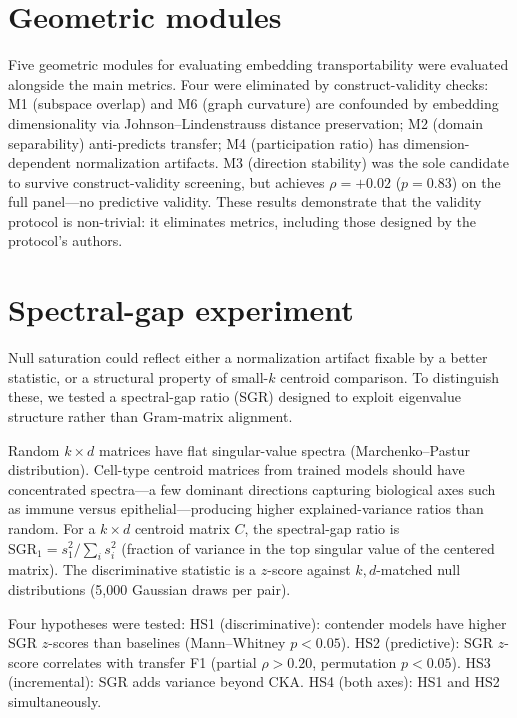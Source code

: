 \documentclass[11pt]{article}
\begin{document}
\section{Geometric modules}
\label{app:modules}

Five geometric modules for evaluating embedding transportability were
evaluated alongside the main metrics. Four were
eliminated by construct-validity checks: M1 (subspace overlap) and M6
(graph curvature) are confounded by embedding dimensionality via
Johnson--Lindenstrauss distance preservation; M2 (domain separability)
anti-predicts transfer; M4 (participation ratio) has
dimension-dependent normalization artifacts. M3 (direction stability)
was the sole candidate to survive construct-validity screening, but
achieves $\rho = +0.02$ ($p = 0.83$) on the full panel---no
predictive validity. These results demonstrate that the validity
protocol is non-trivial: it eliminates metrics, including those designed
by the protocol's authors.


\section{Spectral-gap experiment}
\label{app:spectral}

Null saturation could reflect either a normalization artifact fixable by
a better statistic, or a structural property of small-$k$ centroid
comparison. To distinguish these, we tested a spectral-gap ratio (SGR)
designed to exploit eigenvalue structure rather than Gram-matrix
alignment.

Random $k \times d$ matrices have flat singular-value spectra
(Marchenko--Pastur distribution). Cell-type centroid matrices from
trained models should have concentrated spectra---a few dominant
directions capturing biological axes such as immune versus
epithelial---producing higher explained-variance ratios than random.
For a $k \times d$ centroid matrix $C$, the spectral-gap ratio is
$\mathrm{SGR}_1 = s_1^2 / \sum_i s_i^2$ (fraction of variance in the
top singular value of the centered matrix). The discriminative
statistic is a $z$-score against $k,d$-matched null distributions
(5,000 Gaussian draws per pair).

Four hypotheses were tested: HS1
(discriminative): contender models have higher SGR $z$-scores than
baselines (Mann--Whitney $p < 0.05$). HS2 (predictive): SGR $z$-score
correlates with transfer F1 (partial $\rho > 0.20$, permutation
$p < 0.05$). HS3 (incremental): SGR adds variance beyond CKA. HS4
(both axes): HS1 and HS2 simultaneously.
\end{document}
